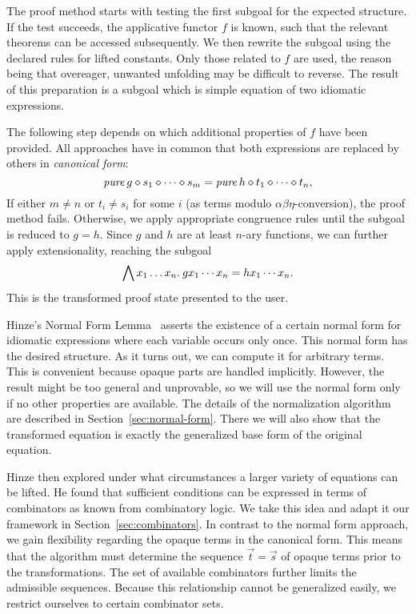 The proof method starts with testing the first subgoal for the expected
structure.
If the test succeeds, the applicative functor $f$ is known, such that the
relevant theorems can be accessed subsequently.
We then rewrite the subgoal using the declared rules for lifted constants.
Only those related to $f$ are used, the reason being that overeager, unwanted
unfolding may be difficult to reverse.
The result of this preparation is a subgoal which is simple equation of two
idiomatic expressions.

The following step depends on which additional properties of $f$ have been
provided.
All approaches have in common that both expressions are replaced by others in
\emph{canonical form}:
\[ \operatorname{\mathit{pure}}{g} \diamond s_1 \diamond \cdots \diamond s_m = \operatorname{\mathit{pure}}{h} \diamond t_1 \diamond \cdots \diamond t_n, \]
If either $m \ne n$ or $t_i \ne s_i$ for some $i$ (as terms modulo
$\alpha\beta\eta$-conversion), the proof method fails.
Otherwise, we apply appropriate congruence rules until the subgoal is reduced
to $g = h$.
Since $g$ and $h$ are at least $n$-ary functions, we can further apply
extensionality, reaching the subgoal
\[ \bigwedge x_1 \dots x_n.\>g x_1 \cdots x_n = h x_1 \cdots x_n. \]
This is the transformed proof state presented to the user.

Hinze's Normal Form Lemma~\cite[7]{hinze10} asserts the existence of a certain
normal form for idiomatic expressions where each variable occurs only once.
This normal form has the desired structure.
As it turns out, we can compute it for arbitrary terms.
This is convenient because opaque parts are handled implicitly.
However, the result might be too general and unprovable, so we will use the
normal form only if no other properties are available.
The details of the normalization algorithm are described in
Section~\ref{sec:normal-form}.
There we will also show that the transformed equation is exactly the generalized
base form of the original equation.

Hinze then explored under what circumstances a larger variety of equations can
be lifted.
He found that sufficient conditions can be expressed in terms of combinators
as known from combinatory logic.
We take this idea and adapt it our framework in Section~\ref{sec:combinators}.
In contrast to the normal form approach, we gain flexibility regarding the
opaque terms in the canonical form.
This means that the algorithm must determine the sequence $\vec t = \vec s$
of opaque terms prior to the transformations.
The set of available combinators further limits the admissible sequences.
Because this relationship cannot be generalized easily, we restrict ourselves
to certain combinator sets.
